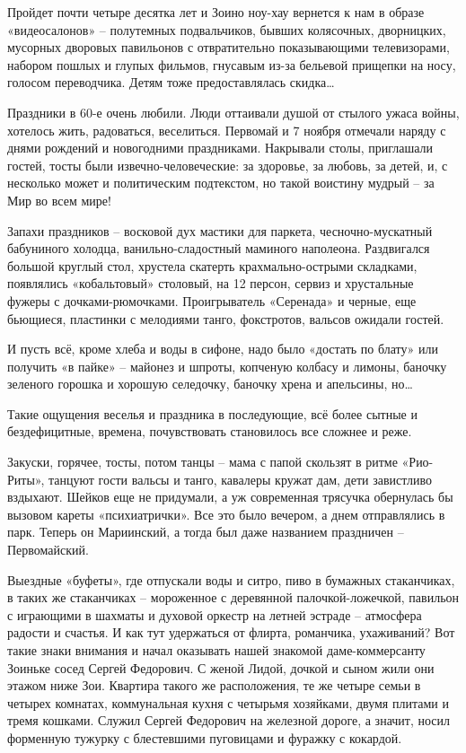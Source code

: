 Пройдет почти четыре десятка лет и Зоино ноу-хау вернется к нам в образе
«видеосалонов» – полутемных подвальчиков, бывших колясочных, дворницких,
мусорных дворовых павильонов с отвратительно показывающими телевизорами,
набором пошлых и глупых фильмов, гнусавым из-за бельевой прищепки на носу,
голосом переводчика. Детям тоже предоставлялась скидка…

Праздники в 60-е очень любили. Люди оттаивали душой от стылого ужаса войны,
хотелось жить, радоваться, веселиться. Первомай и 7 ноября отмечали наряду с
днями рождений и новогодними праздниками. Накрывали столы, приглашали гостей,
тосты были извечно-человеческие: за здоровье, за любовь, за детей, и, с
несколько может и политическим подтекстом, но такой воистину мудрый – за Мир во
всем мире!

Запахи праздников – восковой дух мастики для паркета, чесночно-мускатный
бабуниного холодца, ванильно-сладостный маминого наполеона. Раздвигался большой
круглый стол, хрустела скатерть крахмально-острыми складками, появлялись
«кобальтовый» столовый, на 12 персон,  сервиз и хрустальные фужеры с
дочками-рюмочками. Проигрыватель «Серенада» и черные, еще бьющиеся, пластинки с
мелодиями танго, фокстротов, вальсов ожидали гостей.

И пусть всё, кроме хлеба и воды в сифоне, надо было «достать по блату» или
получить «в пайке» – майонез и шпроты, копченую колбасу и лимоны, баночку
зеленого горошка и хорошую селедочку, баночку хрена и апельсины, но…

Такие ощущения веселья и праздника в последующие, всё более сытные и
бездефицитные, времена, почувствовать становилось все сложнее и реже.

Закуски, горячее, тосты, потом танцы – мама с папой скользят в ритме
«Рио-Риты», танцуют гости вальсы и танго, кавалеры кружат дам, дети завистливо
вздыхают. Шейков еще не придумали, а уж современная трясучка обернулась бы
вызовом кареты «психиатрички». Все это было вечером, а днем отправлялись в
парк. Теперь он Мариинский, а тогда был даже названием праздничен –
Первомайский.

Выездные «буфеты», где отпускали воды и ситро, пиво в бумажных стаканчиках, в
таких же стаканчиках – мороженное с деревянной палочкой-ложечкой, павильон с
играющими в шахматы и духовой оркестр на летней эстраде – атмосфера радости и
счастья. И как тут удержаться от флирта, романчика, ухаживаний? Вот такие знаки
внимания и начал оказывать нашей знакомой даме-коммерсанту Зоиньке сосед Сергей
Федорович. С женой Лидой, дочкой и сыном жили они этажом ниже Зои. Квартира
такого же расположения, те же четыре семьи в четырех комнатах, коммунальная
кухня с четырьмя хозяйками, двумя плитами и тремя кошками. Служил Сергей
Федорович на железной дороге, а значит, носил форменную тужурку с блестевшими
пуговицами и фуражку с кокардой.


